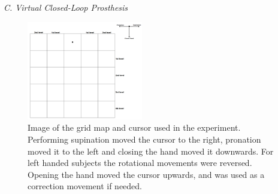

\textit{C. Virtual Closed-Loop Prosthesis}





\begin{figure}[H]                 
	\includegraphics[width=0.45\textwidth]{figures/gridmap2}  
	\caption{Image of the grid map and cursor used in the experiment. Performing supination moved the cursor to the right, pronation moved it to the left and closing the hand moved it downwards. For left handed subjects the rotational movements were reversed. Opening the hand moved the cursor upwards, and was used as a correction movement if needed.}
	\label{fig:meth:gridmap} 
\end{figure}